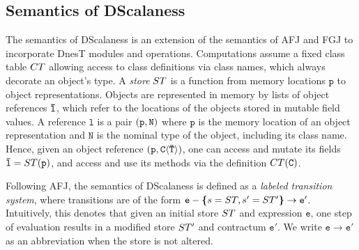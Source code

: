 \subsection{Semantics of DScalaness}

The semantics of DScalaness is an extension of the semantics of AFJ and FGJ to incorporate DnesT
modules and operations. Computations assume a fixed class table ${CT}$ allowing access to class
definitions via class names, which always decorate an object's type. A \emph{store} $ST$ is
a function from memory locations $\texttt{p}$ to object representations. Objects are represented
in memory by lists of object references ${\mathtt{\bar{l}}}$, which refer to the locations of the objects
stored in mutable field values. A reference $\texttt{l}$ is a pair $\mathtt{(}\texttt{p},\mathtt{N)}$ where
$\texttt{p}$ is the memory location of an object representation and $\texttt{N}$ is the nominal
type of the object, including its class name. Hence, given an object reference
$\mathtt{(}\texttt{p},\mathtt{\mathtt{C\langle {\ensuremath{\mathtt{\bar{T}}}} \rangle})}$, one can access and mutate its fields ${\mathtt{\bar{l}}} =
ST(\texttt{p})$, and access and use its methods via the definition ${CT}(\texttt{C})$.

Following AFJ, the semantics of DScalaness is defined as a \emph{labeled transition system},
where transitions are of the form $\texttt{e} - \textup{\textbf{\{}} s = ST, s' = ST' \textup{\textbf{\}}} \rightarrow
\texttt{e}' $. Intuitively, this denotes that given an initial store $ST$ and expression
$\texttt{e}$, one step of evaluation results in a modified store $ST'$ and contractum
$\texttt{e}'$. We write $\texttt{e} \rightarrow \texttt{e}'$ as an abbreviation when the store
is not altered.

